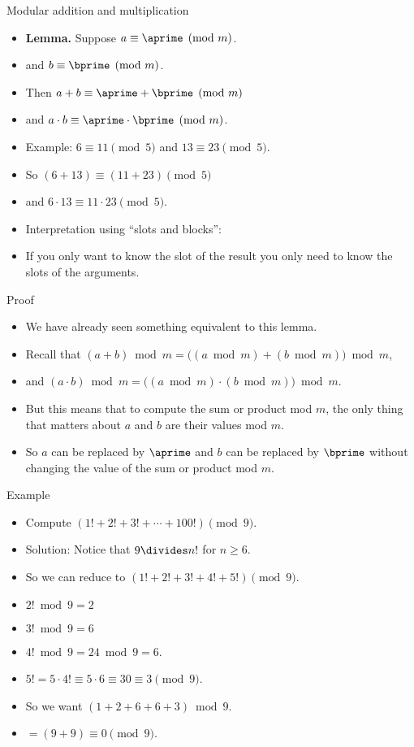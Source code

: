 \documentclass{beamer}
\begin{document}
\begin{frame}{Modular addition and multiplication}
\begin{itemize}
  \item \textbf{Lemma.} Suppose $a \equiv \aprime \pmod {m}$.
  \item and $b  \equiv \bprime \pmod {m}$.
  \item Then $a+b \equiv \aprime + \bprime \pmod {m}$
  \item and $a \cdot b \equiv \aprime \cdot \bprime \pmod {m}$.
  \item Example: $6 \equiv 11 \pmod 5$ and $13\equiv 23 \pmod 5$.
  \item So $(6+13) \equiv (11 +23) \pmod 5$
  \item and  $6\cdot 13 \equiv 11\cdot 23 \pmod 5$.
  \item Interpretation using ``slots and blocks'':
  \item If you only want to know the slot
  of the result you only need to know the slots of the arguments.
\end{itemize}
\end{frame}

\begin{frame}{Proof}
\begin{itemize}
  \item We have already seen something equivalent to this lemma.
  \item Recall that $(a+b)\bmod m = \big( (a\bmod m) + (b\bmod m) \big) \bmod m$,
  \item and $(a\cdot b)\bmod m = \big( (a\bmod m) \cdot (b\bmod m) \big) \bmod m$.
  \item But this means that to compute the sum or product mod $m$, the only thing that
  matters about $a$ and $b$ are their values mod $m$.
  \item So $a$ can be replaced by
  $\aprime$ and $b$ can be replaced by $\bprime$ without changing the value of
  the sum or product mod $m$.
\end{itemize}
\end{frame}

\begin{frame}{Example}
\begin{itemize}
  \item Compute $(1! + 2! + 3! + \cdots + 100!) \pmod 9$.
  \item Solution: Notice that $9\divides n!$ for $n\geq 6$.
  \item So we can reduce to $(1! + 2! + 3! + 4! + 5!) \pmod 9$.
  \item $2! \bmod 9 = 2$
  \item $3! \bmod 9 = 6$
  \item $4! \bmod 9 = 24 \bmod 9 = 6$.
  \item $5! = 5 \cdot 4! \equiv 5 \cdot 6 \equiv 30 \equiv 3 \pmod 9$.
  \item So we want $(1 + 2 + 6 + 6 + 3) \bmod 9$.
  \item $=(9+9) \equiv 0 \pmod 9$.
\end{itemize}
\end{frame}
\end{document}
